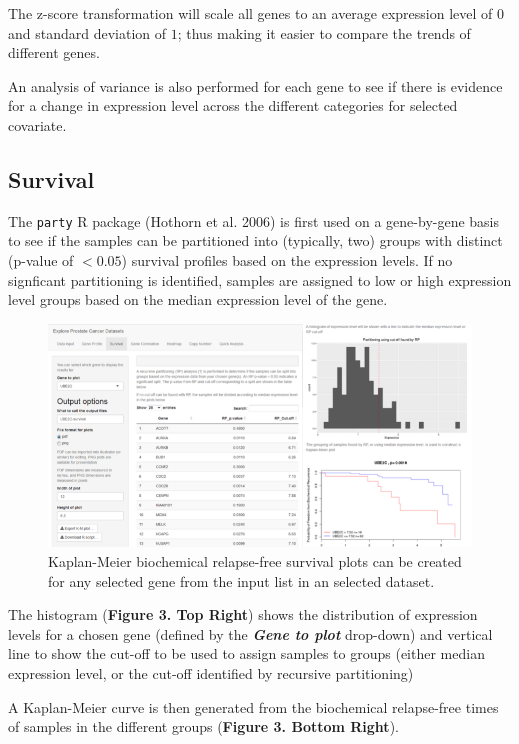 \documentclass[]{article}
\begin{document}
The z-score transformation will scale all genes to an average expression
level of \(0\) and standard deviation of \(1\); thus making it easier to
compare the trends of different genes.

An analysis of variance is also performed for each gene to see if there
is evidence for a change in expression level across the different
categories for selected covariate.

\subsection{Survival}\label{survival}

The \texttt{party} R package (Hothorn et al. 2006) is first used on a
gene-by-gene basis to see if the samples can be partitioned into
(typically, two) groups with distinct (p-value of \(<0.05\)) survival
profiles based on the expression levels. If no signficant partitioning
is identified, samples are assigned to low or high expression level
groups based on the median expression level of the gene.

\begin{figure}[htbp]
\centering
\includegraphics{Figure3.png}
\caption{Kaplan-Meier biochemical relapse-free survival plots can be
created for any selected gene from the input list in an selected
dataset.}
\end{figure}

The histogram (\textbf{Figure 3. Top Right}) shows the distribution of
expression levels for a chosen gene (defined by the \textbf{\emph{Gene
to plot}} drop-down) and vertical line to show the cut-off to be used to
assign samples to groups (either median expression level, or the cut-off
identified by recursive partitioning)

A Kaplan-Meier curve is then generated from the biochemical relapse-free
times of samples in the different groups (\textbf{Figure 3. Bottom
Right}).
\end{document}

